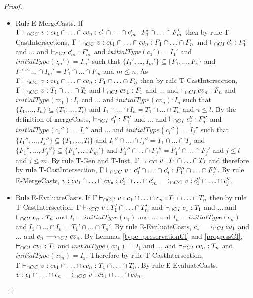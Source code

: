 \documentclass[a4paper]{article}
\begin{document}
\begin{proof}
\begin{itemize}
    \item Rule E-MergeCasts.
    If $\Gamma \vdash_{\cap CC} v : cv_1 \cap \ldots \cap cv_n : c_1' \cap \ldots \cap c_m' : F_1' \cap \ldots \cap F_m'$ then by rule T-CastIntersections, $\Gamma \vdash_{\cap CC} v : cv_1 \cap \ldots \cap cv_n : F_1 \cap \ldots \cap F_n$ and $\vdash_{\cap CI} c_1' : F_1'$ and ... and $\vdash_{\cap CI} c_m' : F_m'$ and $initialType(c_1') = I_1'$ and $initialType(c_m') = I_m'$ such that $\{I_1', \ldots, I_m'\} \subseteq \{F_1, \ldots, F_n\}$ and $I_1' \cap \ldots \cap I_m' = F_1 \cap \ldots \cap F_m$ and $m \leq n$.
    As $\Gamma \vdash_{\cap CC} v : cv_1 \cap \ldots \cap cv_n : F_1 \cap \ldots \cap F_n$ then by rule T-CastIntersection, $\Gamma \vdash_{\cap CC} v : T_1 \cap \ldots \cap T_l$ and $\vdash_{\cap CI} cv_1 : F_1$ and ... and $\vdash_{\cap CI} cv_n : F_n$ and $initialType(cv_1) : I_1$ and ... and $initialType(cv_n) : I_n$ such that $\{I_1, \ldots, I_n\} \subseteq \{T_1, \ldots, T_l\}$ and $I_1 \cap \ldots \cap I_n = T_1 \cap \ldots \cap T_n$ and $n \leq l$.
    By the definition of mergeCasts, $\vdash_{\cap CI} c_1'' : F_1''$ and ... and $\vdash_{\cap CI} c_j'' : F_j''$ and $initialType(c_1'') = I_1''$ and ... and $initialType(c_j'') = I_j''$ such that $\{I_1'', \ldots, I_j''\} \subseteq \{T_1, \ldots, T_l\}$ and $I_1'' \cap \ldots \cap I_j'' = T_1 \cap \ldots \cap T_j$ and $\{F_1'', \ldots, F_j''\} \subseteq \{F_1', \ldots, F_m'\}$ and $F_1'' \cap \ldots \cap F_j'' = F_1' \cap \ldots \cap F_j'$ and $j \leq l$ and $j \leq m$.
    By rule T-Gen and T-Inst, $\Gamma \vdash_{\cap CC} v : T_1 \cap \ldots \cap T_j$ and therefore by rule T-CastIntersection, $\Gamma \vdash_{\cap CC} v : c_1'' \cap \ldots \cap c_j'' : F_1'' \cap \ldots \cap F_j''$.
    By rule E-MergeCasts, $v : cv_1 \cap \ldots \cap cv_n : c_1' \cap \ldots \cap c_m' \longrightarrow_{\cap CC} v : c_1'' \cap \ldots \cap c_j''$.
    \item Rule E-EvaluateCasts.
    If $\Gamma \vdash_{\cap CC} v : c_1 \cap \ldots \cap c_n : T_1 \cap \ldots \cap T_n$ then by rule T-CastIntersection, $\Gamma \vdash_{\cap CC} v : T_1' \cap \ldots \cap T_n'$ and $\vdash_{\cap CI} c_1 : T_1$ and ... and $\vdash_{\cap CI} c_n : T_n$ and $I_1 = initialType(c_1)$ and ... and $I_n = initialType(c_n)$ and $I_1 \cap \ldots \cap I_n = T_1' \cap \ldots \cap T_n'$.
    By rule E-EvaluateCasts, $c_1 \longrightarrow_{\cap CI} cv_1$ and ... and $c_n \longrightarrow_{\cap CI} cv_n$.
    By Lemmas \ref{type_preservationCI} and \ref{progressCI}, $\vdash_{\cap CI} cv_1 : T_1$ and $initialType(cv_1) = I_1$ and ... and $\vdash_{\cap CI} cv_n : T_n$ and $initialType(cv_n) = I_n$.
    Therefore by rule T-CastIntersection, $\Gamma \vdash_{\cap CC} v : cv_1 \cap \ldots \cap cv_n : T_1 \cap \ldots \cap T_n$.
    By rule E-EvaluateCasts, $v : c_1 \cap \ldots \cap c_n \longrightarrow_{\cap CC} v : cv_1 \cap \ldots \cap cv_n$.

\end{itemize}
\end{proof}
\end{document}
